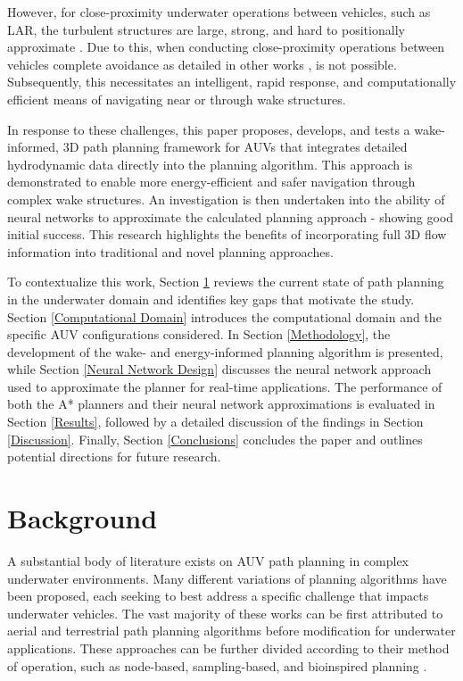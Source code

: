 \documentclass[final,5p,times,twocolumn]{elsarticle}
\begin{document}
However, for close-proximity underwater operations between vehicles, such as LAR, the turbulent structures are large, strong, and hard to positionally approximate \cite{IEEE, SUBSTEC}. Due to this, when conducting close-proximity operations between vehicles complete avoidance as detailed in other works \cite{X9}, is not possible. Subsequently, this necessitates an intelligent, rapid response, and computationally efficient means of navigating near or through wake structures.

In response to these challenges, this paper proposes, develops, and tests a wake-informed, 3D path planning framework for AUVs that integrates detailed hydrodynamic data directly into the planning algorithm. This approach is demonstrated to enable more energy-efficient and safer navigation through complex wake structures. An investigation is then undertaken into the ability of neural networks to approximate the calculated planning approach - showing good initial success. This research highlights the benefits of incorporating full 3D flow information into traditional and novel planning approaches.

To contextualize this work, Section \ref{Background} reviews the current state of path planning in the underwater domain and identifies key gaps that motivate the study. Section \ref{Computational Domain} introduces the computational domain and the specific AUV configurations considered. In Section \ref{Methodology}, the development of the wake- and energy-informed planning algorithm is presented, while Section \ref{Neural Network Design} discusses the neural network approach used to approximate the planner for real-time applications. The performance of both the A* planners and their neural network approximations is evaluated in Section \ref{Results}, followed by a detailed discussion of the findings in Section \ref{Discussion}. Finally, Section \ref{Conclusions} concludes the paper and outlines potential directions for future research.

\section{Background} %
\label{Background} %

A substantial body of literature exists on AUV path planning in complex underwater environments. Many different variations of planning algorithms have been proposed, each seeking to best address a specific challenge that impacts underwater vehicles. The vast majority of these works can be first attributed to aerial and terrestrial path planning algorithms before modification for underwater applications. These approaches can be further divided according to their method of operation, such as node-based, sampling-based, and bioinspired planning \cite{Petres2007}. 
\end{document}
